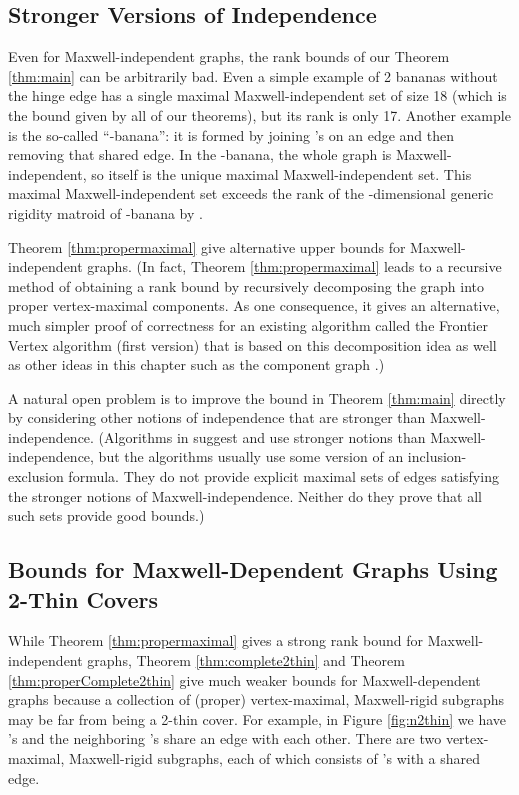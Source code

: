 \documentclass[10pt]{article}
\begin{document}
\subsection{Stronger Versions of Independence}\label{sec:stronger}
Even for Maxwell-independent graphs, the rank bounds of our Theorem \ref{thm:main}
can be arbitrarily bad. Even a simple
example of 2 bananas without the hinge edge has a single maximal
Maxwell-independent set of size 18 (which is the bound given by all of our
theorems), but its rank is only 17. Another example is the so-called ``-banana'': it is formed by joining  's on an edge and then removing that shared edge. In the -banana, the whole graph is Maxwell-independent, so itself is the unique maximal Maxwell-independent set. This maximal Maxwell-independent set exceeds the rank of the -dimensional generic rigidity matroid of -banana by .

\medskip\noindent Theorem \ref{thm:propermaximal} give alternative upper bounds for Maxwell-independent graphs. (In fact, Theorem \ref{thm:propermaximal} leads to a recursive method of obtaining a rank bound by recursively decomposing the graph into proper vertex-maximal
components. As one consequence, it gives an alternative, much simpler proof of
correctness for an existing algorithm called the Frontier Vertex algorithm (first version) that is based on
this decomposition idea as well as other ideas in this
chapter such as the component graph \cite{bib:survey}.)

\medskip\noindent
A natural open problem is to improve the bound in Theorem \ref{thm:main} directly by considering other
notions of independence that are stronger than Maxwell-independence. (Algorithms in \cite{sitharam:zhou:tractableADG:2004, bib:survey}
suggest and use stronger notions than Maxwell-independence,
but the algorithms usually
use some version of an inclusion-exclusion formula. They do not
provide explicit maximal sets of edges satisfying the stronger notions of
Maxwell-independence.
Neither do they prove that all such sets provide good bounds.)


\subsection{Bounds for Maxwell-Dependent Graphs Using 2-Thin Covers}\label{sec:Maxwelldependent}

\medskip\noindent While Theorem \ref{thm:propermaximal} gives a strong rank bound for Maxwell-independent graphs, Theorem \ref{thm:complete2thin} and Theorem \ref{thm:properComplete2thin} give much weaker bounds for Maxwell-dependent graphs because a collection of (proper) vertex-maximal, Maxwell-rigid subgraphs may be far from being a 2-thin cover. For example, in Figure \ref{fig:n2thin} we have  's and the neighboring 's share an edge with each other. There are two vertex-maximal, Maxwell-rigid subgraphs, each of which consists of  's with a shared edge.
\end{document}
